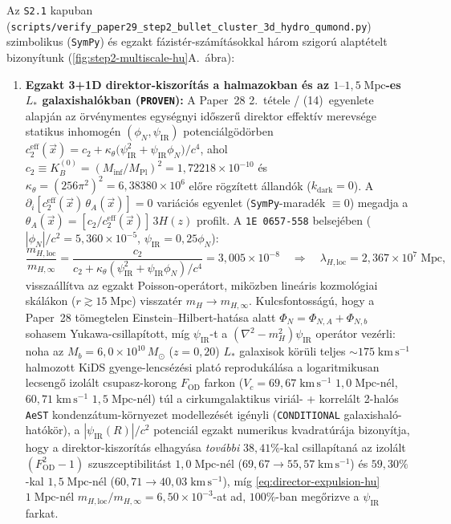 \documentclass[11pt,a4paper]{article}
\begin{document}
Az \texttt{S2.1} kapuban (\texttt{scripts/\allowbreak verify\_paper29\_\allowbreak step2\_\allowbreak bullet\_cluster\_\allowbreak 3d\_hydro\_qumond.py}) szimbolikus (\texttt{SymPy}) és egzakt fázistér-számításokkal három szigorú alaptételt bizonyítunk (\ref{fig:step2-multiscale-hu}A.~ábra):
\begin{enumerate}
    \item \textbf{Egzakt 3+1D direktor-kiszorítás a halmazokban és az $1\text{--}1{,}5\;\mathrm{Mpc}$-es $L_*$ galaxishalókban (\texttt{PROVEN}):} A Paper~28 2.~tétele / (14)~egyenlete alapján az örvénymentes egységnyi időszerű direktor effektív merevsége statikus inhomogén $(\phi_N, \psi_{\mathrm{IR}})$ potenciálgödörben $c_2^{\mathrm{eff}}(\vec{x}) = c_2 + \kappa_\theta\bigl(\psi_{\mathrm{IR}}^2 + \psi_{\mathrm{IR}}\phi_N\bigr)/c^4$, ahol $c_2 \equiv K_B^{(0)} = (M_{\mathrm{inf}}/M_{\mathrm{Pl}})^2 = 1{,}72218\times 10^{-10}$ és $\kappa_\theta = (256\pi^2)^2 = 6{,}38380\times 10^6$ előre rögzített állandók ($k_{\mathrm{dark}} = 0$). A $\partial_i[c_2^{\mathrm{eff}}(\vec{x})\,\theta_A(\vec{x})] = 0$ variációs egyenlet (\texttt{SymPy}-maradék $\equiv 0$) megadja a $\theta_A(\vec{x}) = [c_2/c_2^{\mathrm{eff}}(\vec{x})]\,3H(z)$ profilt. A \texttt{1E~0657-558} belsejében ($|\phi_N|/c^2 = 5{,}360\times 10^{-5}$, $\psi_{\mathrm{IR}} = 0{,}25\phi_N$):
    \begin{equation}
        \frac{m_{H,\mathrm{loc}}}{m_{H,\infty}} = \frac{c_2}{c_2 + \kappa_\theta(\psi_{\mathrm{IR}}^2 + \psi_{\mathrm{IR}}\phi_N)/c^4} = 3{,}005\times 10^{-8} \quad\Longrightarrow\quad \lambda_{H,\mathrm{loc}} = 2{,}367\times 10^7\;\mathrm{Mpc},
        \label{eq:director-expulsion-hu}
    \end{equation}
    visszaállítva az egzakt Poisson-operátort, miközben lineáris kozmológiai skálákon ($r \gtrsim 15\;\mathrm{Mpc}$) visszatér $m_H \to m_{H,\infty}$. Kulcsfontosságú, hogy a Paper~28 tömegtelen Einstein--Hilbert-hatása alatt $\Phi_N = \Phi_{N,A} + \Phi_{N,b}$ sohasem Yukawa-csillapított, míg $\psi_{\mathrm{IR}}$-t a $(\nabla^2 - m_H^2)\psi_{\mathrm{IR}}$ operátor vezérli: noha az $M_b = 6{,}0\times 10^{10}\,M_\odot$ ($z = 0{,}20$) $L_*$ galaxisok körüli teljes $\sim 175\;\mathrm{km\,s^{-1}}$ halmozott KiDS gyenge-lencsézési plató \cite{Mistele2024} reprodukálása a logaritmikusan lecsengő izolált csupasz-korong $F_{\mathrm{OD}}$ farkon ($V_c = 69{,}67\;\mathrm{km\,s^{-1}}$ $1{,}0\;\mathrm{Mpc}$-nél, $60{,}71\;\mathrm{km\,s^{-1}}$ $1{,}5\;\mathrm{Mpc}$-nél) túl a cirkumgalaktikus viriál- + korrelált 2-halós \texttt{AeST} kondenzátum-környezet modellezését igényli (\texttt{CONDITIONAL} galaxishaló-hatókör), a $|\psi_{\mathrm{IR}}(R)|/c^2$ potenciál egzakt numerikus kvadratúrája bizonyítja, hogy a direktor-kiszorítás elhagyása \emph{további} $38{,}41\%$-kal csillapítaná az izolált $(F_{\mathrm{OD}}^2 - 1)$ szuszceptibilitást $1{,}0\;\mathrm{Mpc}$-nél ($69{,}67 \to 55{,}57\;\mathrm{km\,s^{-1}}$) és $59{,}30\%$-kal $1{,}5\;\mathrm{Mpc}$-nél ($60{,}71 \to 40{,}03\;\mathrm{km\,s^{-1}}$), míg \eqref{eq:director-expulsion-hu} $1\;\mathrm{Mpc}$-nél $m_{H,\mathrm{loc}}/m_{H,\infty} = 6{,}50\times 10^{-3}$-at ad, $100\%$-ban megőrizve a $\psi_{\mathrm{IR}}$ farkat.

\end{enumerate}
\end{document}
